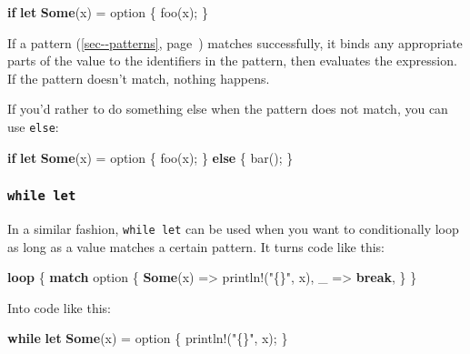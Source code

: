 \documentclass[a4paper,]{book}
\renewcommand*{\hyperref}[2][\ar]{%
  \def\ar{#2}%
  #2 (\autoref{#1}, page~\pageref{#1})}
\newenvironment{Shaded}{\begin{snugshade}}{\end{snugshade}}
\newcommand{\KeywordTok}[1]{\textcolor[rgb]{0.13,0.29,0.53}{\textbf{{#1}}}}
\newcommand{\StringTok}[1]{\textcolor[rgb]{0.31,0.60,0.02}{{#1}}}
\newcommand{\OtherTok}[1]{\textcolor[rgb]{0.56,0.35,0.01}{{#1}}}
\newcommand{\NormalTok}[1]{{#1}}
\begin{document}
\begin{Shaded}
\begin{Highlighting}[]
\KeywordTok{if} \KeywordTok{let} \KeywordTok{Some}\NormalTok{(x) = option \{}
    \NormalTok{foo(x);}
\NormalTok{\}}
\end{Highlighting}
\end{Shaded}

If a \hyperref[sec--patterns]{pattern} matches successfully, it binds
any appropriate parts of the value to the identifiers in the pattern,
then evaluates the expression. If the pattern doesn't match, nothing
happens.

If you'd rather to do something else when the pattern does not match,
you can use \texttt{else}:

\begin{Shaded}
\begin{Highlighting}[]
\KeywordTok{if} \KeywordTok{let} \KeywordTok{Some}\NormalTok{(x) = option \{}
    \NormalTok{foo(x);}
\NormalTok{\} }\KeywordTok{else} \NormalTok{\{}
    \NormalTok{bar();}
\NormalTok{\}}
\end{Highlighting}
\end{Shaded}

\subsubsection{\texorpdfstring{\texttt{while\ let}}{while let}}\label{while-let}

In a similar fashion, \texttt{while\ let} can be used when you want to
conditionally loop as long as a value matches a certain pattern. It
turns code like this:

\begin{Shaded}
\begin{Highlighting}[]
\KeywordTok{loop} \NormalTok{\{}
    \KeywordTok{match} \NormalTok{option \{}
        \KeywordTok{Some}\NormalTok{(x) => }\OtherTok{println!}\NormalTok{(}\StringTok{"\{\}"}\NormalTok{, x),}
        \NormalTok{_ => }\KeywordTok{break}\NormalTok{,}
    \NormalTok{\}}
\NormalTok{\}}
\end{Highlighting}
\end{Shaded}

Into code like this:

\begin{Shaded}
\begin{Highlighting}[]
\KeywordTok{while} \KeywordTok{let} \KeywordTok{Some}\NormalTok{(x) = option \{}
    \OtherTok{println!}\NormalTok{(}\StringTok{"\{\}"}\NormalTok{, x);}
\NormalTok{\}}
\end{Highlighting}
\end{Shaded}
\end{document}

